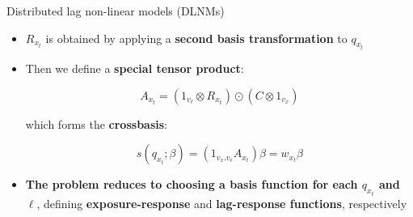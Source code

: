\documentclass[english]{beamer}
\newcommand{\alertblue}[1]{{\color{blue}#1}}
\begin{document}
\begin{frame}{Distributed lag non-linear models (DLNMs)}
\begin{itemize}
    \item \textbf{\alertblue{\( R_{x_t} \)}} is obtained by applying a \textbf{\alertblue{second basis transformation}} to \textbf{\alertblue{\( q_{x_t} \)}}

    \item Then we define a \textbf{\alertblue{special tensor product}}:

\[A_{x_t} = (1_{v_\ell} \otimes R_{x_t}) \odot (C \otimes 1_{v_x})\]

which forms the \textbf{\alertblue{crossbasis}}:

\[s(q_{x_t}; \beta) = (1_{v_x.v_\ell} A_{x_t}) \beta = w_{x_t} \beta\]

    \item \textbf{\alertblue{The problem reduces to choosing a basis function for each \( q_{x_t} \) and \( \ell \)}}, defining \textbf{\alertblue{exposure-response}} and \textbf{\alertblue{lag-response functions}}, respectively
\end{itemize}
\end{frame}
\end{document}
